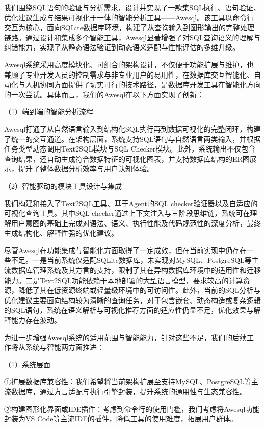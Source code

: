\begin{CJK*}{UTF8}{song}

我们围绕SQL语句的验证与分析需求，设计并实现了一款集SQL执行、语句验证、优化建议生成与结果可视化于一体的智能分析工具——Awesql。该工具以命令行交互为核心，面向SQLite数据库环境，构建了从查询输入到图形输出的完整处理链路。通过设计和集成多个智能工具，Awesql显著增强了对SQL查询语义的理解与纠错能力，实现了从静态语法验证到动态语义适配与性能评估的多维升级。

Awesql系统采用高度模块化、可组合的架构设计，不仅便于功能扩展与维护，也兼顾了专业开发人员的控制需求与非专业用户的易用性，在数据库交互智能化、自动化与人机协同方面提供了切实可行的技术路径，是数据库开发工具在智能化方向的一次尝试。具体而言，我们的Awesql在以下方面实现了创新：

（1）端到端的智能分析流程

Awesql打通了从自然语言输入到结构化SQL执行再到数据可视化的完整闭环，构建了统一的交互通道。在架构层面，系统支持SQL语句与自然语言两类输入，并根据任务类型动态调用Text2SQL模块与SQL Checker模块。此外，系统输出不仅包含查询结果，还自动生成符合数据特征的可视化图表，并支持数据库结构的ER图展示，提升了整体数据分析效率与用户认知体验。

（2）智能驱动的模块工具设计与集成

我们构建和接入了Text2SQL工具、基于Agent的SQL checker验证器以及自适应的可视化查询工具。其中SQL checker通过上下文注入与三阶段思维链，系统可在理解用户意图的基础上完成对语法、语义、执行性能及代码规范性的深度分析，最终生成结构化、解释性强的优化建议。

尽管Awesql在功能集成与智能化方面取得了一定成效，但在当前实现中仍存在一些不足。一是当前系统仅适配SQLite数据库，未实现对MySQL、PostgreSQL等主流数据库管理系统及其方言的支持，限制了其在异构数据库环境中的适用性和迁移能力。二是Text2SQL功能依赖于本地部署的大型语言模型，要求较高的计算资源，降低了其在低资源终端或轻量级环境中的可访问性。此外，当前的SQL分析与优化建议主要面向结构较为清晰的查询任务，对于包含嵌套、动态构造或复杂逻辑的SQL语句，系统在语义解析与可视化推荐方面的适应性仍显不足，优化效果与解释能力存在波动。

为进一步增强Awesql系统的适用范围与智能能力，针对这些不足，我们的后续工作将从系统与智能两方面推进：

（1）系统层面

①扩展数据库兼容性：我们希望将当前架构扩展至支持MySQL、PostgreSQL等主流数据库，通过方言适配与执行引擎封装，提升系统的通用性与生态兼容性。


②构建图形化界面或IDE插件：考虑到命令行的使用门槛，我们考虑将Awesql功能封装为VS Code等主流IDE的插件，降低工具的使用难度，拓展用户群体。



\end{CJK*}
